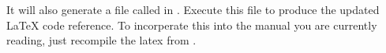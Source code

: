 \documentclass[11pt]{report}
\begin{document}
\begin{appendices}
It will also generate a file called  in . Execute this file to produce the updated \LaTeX{} code reference. To incorperate this into the manual you are currently reading, just recompile the latex from . 




\end{appendices}
\end{document}
